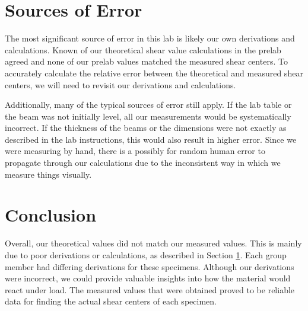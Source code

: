 \documentclass[12 pt]{report}
\begin{document}
\section{Sources of Error}\label{sources_of_error}
The most significant source of error in this lab is likely our own derivations and calculations. Known of our theoretical shear value calculations in the prelab agreed and none of our prelab values matched the measured shear centers. To accurately calculate the relative error between the theoretical and measured shear centers, we will need to revisit our derivations and calculations.

Additionally, many of the typical sources of error still apply. If the lab table or the beam was not initially level, all our measurements would be systematically incorrect. If the thickness of the beams or the dimensions were not exactly as described in the lab instructions, this would also result in higher error. Since we were measuring by hand, there is a possibly for random human error to propagate through our calculations due to the inconsistent way in which we measure things visually.

\section{Conclusion} \label{conclusion-section}

Overall, our theoretical values did not match our measured values. This is mainly due to poor derivations or calculations, as described in Section \ref{sources_of_error}. Each group member had differing derivations for these specimens. Although our derivations were incorrect, we could provide valuable insights into how the material would react under load. The measured values that were obtained proved to be reliable data for finding the actual shear centers of each specimen.

\printbibliography[heading=subbibintoc]
\appendix
\end{document}
